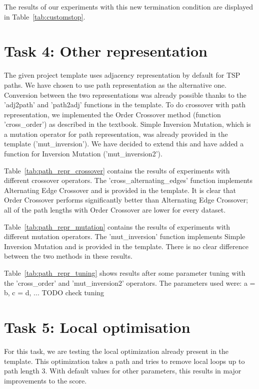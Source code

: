 \documentclass{report}
\begin{document}
The results of our experiments with this new termination condition are displayed in Table~\ref{tab:customstop}.



\section{Task 4: Other representation}
The given project template uses adjacency representation by default for TSP paths. We have chosen to use path representation as the alternative one. Conversion between the two representations was already possible thanks to the 'adj2path' and 'path2adj' functions in the template. To do crossover with path representation, we implemented the Order Crossover method (function 'cross\_order') as described in the textbook. Simple Inversion Mutation, which is a mutation operator for path representation, was already provided in the template ('mut\_inversion'). We have decided to extend this and have added a function for Inversion Mutation ('mut\_inversion2').

Table~\ref{tab:path_repr_crossover} contains the results of experiments with different crossover operators. The 'cross\_alternating\_edges' function implements Alternating Edge Crossover and is provided in the template. It is clear that Order Crossover performs significantly better than Alternating Edge Crossover; all of the path lengths with Order Crossover are lower for every dataset.


Table~\ref{tab:path_repr_mutation} contains the results of experiments with different mutation operators. The 'mut\_inversion' function implements Simple Inversion Mutation and is provided in the template. There is no clear difference between the two methods in these results.


Table~\ref{tab:path_repr_tuning} shows results after some parameter tuning with the 'cross\_order' and 'mut\_inversion2' operators. The parameters used were: a = b, c = d, ... TODO  check tuning




\section{Task 5: Local optimisation}
\label{sec:local}
For this task, we are testing the local optimization already present in the template. This optimization takes a path and tries to remove local loops up to path length 3. With default values for other parameters, this results in major improvements to the score.
\end{document}
